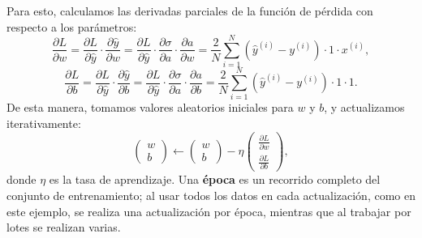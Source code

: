 \documentclass[a4,11pt]{aleph-notas}
\begin{document}
Para esto, calculamos las derivadas parciales de la función de pérdida con respecto a los parámetros:
\[
    \frac{\partial L}{\partial w} 
    = \frac{\partial L}{\partial \hat y} \cdot \frac{\partial \hat y}{\partial w}
    = \frac{\partial L}{\partial \hat y} \cdot \frac{\partial \sigma}{\partial a} \cdot \frac{\partial a}{\partial w}
    = \frac{2}{N} \sum_{i=1}^N ( \hat y^{(i)} - y^{(i)} ) \cdot 1 \cdot x^{(i)},
\]
\[
    \frac{\partial L}{\partial b} 
    = \frac{\partial L}{\partial \hat y} \cdot \frac{\partial \hat y}{\partial b}
    = \frac{\partial L}{\partial \hat y} \cdot \frac{\partial \sigma}{\partial a} \cdot \frac{\partial a}{\partial b}
    = \frac{2}{N} \sum_{i=1}^N ( \hat y^{(i)} - y^{(i)} ) \cdot 1 \cdot 1.
\]
De esta manera, tomamos valores aleatorios iniciales para \(w\) y \(b\), y actualizamos iterativamente:
\[
    \begin{pmatrix}
        w \\ b
    \end{pmatrix}
    \leftarrow
    \begin{pmatrix}
        w \\ b
    \end{pmatrix}
    - \eta
    \begin{pmatrix}
        \frac{\partial L}{\partial w} \\[6pt]
        \frac{\partial L}{\partial b}
    \end{pmatrix},
\]
donde \(\eta\) es la tasa de aprendizaje. Una \textbf{época} es un recorrido completo del conjunto de entrenamiento; al usar todos los datos en cada actualización, como en este ejemplo, se realiza una actualización por época, mientras que al trabajar por lotes se realizan varias.
\end{document}
